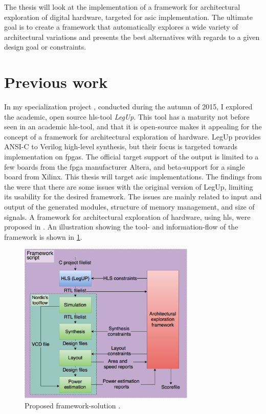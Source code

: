 The thesis will look at the implementation of a framework for architectural exploration of digital hardware, targeted for \gls{asic} implementation. The ultimate goal is to create a framework that automatically explores a wide variety of architectural variations and presents the best alternatives with regards to a given design goal or constraints.
\section{Previous work}
In my specialization project \cite{holm2015pro}, conducted during the autumn of 2015, I explored the academic, open source \gls{hls}-tool \textit{LegUp}. This tool has a maturity not before seen in an academic \gls{hls}-tool, and that it is open-source makes it appealing for the concept of a framework for architectural exploration of hardware. LegUp provides ANSI-C to Verilog high-level synthesis, but their focus is targeted towards implementation on \gls{fpga}s. The official target support of the output is limited to a few boards from the \gls{fpga} manufacturer Altera, and beta-support for a single board from Xilinx. This thesis will target \gls{asic} implementations. The findings from the \cite{holm2015pro} were that there are some issues with the original version of LegUp, limiting its usability for the desired framework. The issues are mainly related to input and output of the generated modules, structure of memory management, and size of signals. A framework for architectural exploration of hardware, using \gls{hls}, were proposed in \cite{holm2015pro}. An illustration showing the tool- and information-flow of the framework is shown in \cref{fig:frameworkflow}.

\begin{figure}[hbpt]
\centering
\includegraphics[width=0.75\textwidth]{../figs/Framework.png}
\caption{\label{fig:frameworkflow}Proposed framework-solution \cite{holm2015pro}.}
\end{figure}


